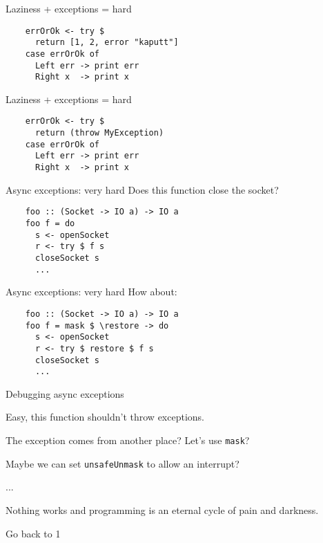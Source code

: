 \documentclass[20pt]{beamer}
\begin{document}
\begin{frame}[fragile]{Laziness + exceptions = hard}
    \begin{lstlisting}
    errOrOk <- try $
      return [1, 2, error "kaputt"]
    case errOrOk of
      Left err -> print err
      Right x  -> print x
    \end{lstlisting}
\end{frame}

\begin{frame}[fragile]{Laziness + exceptions = hard}
    \begin{lstlisting}
    errOrOk <- try $
      return (throw MyException)
    case errOrOk of
      Left err -> print err
      Right x  -> print x
    \end{lstlisting}
\end{frame}

\begin{frame}[fragile]{Async exceptions: very hard}
    Does this function close the socket?
    \begin{lstlisting}
    foo :: (Socket -> IO a) -> IO a
    foo f = do
      s <- openSocket
      r <- try $ f s
      closeSocket s
      ...
    \end{lstlisting}
\end{frame}

\begin{frame}[fragile]{Async exceptions: very hard}
    How about:
    \begin{lstlisting}
    foo :: (Socket -> IO a) -> IO a
    foo f = mask $ \restore -> do
      s <- openSocket
      r <- try $ restore $ f s
      closeSocket s
      ...
    \end{lstlisting}
\end{frame}

\begin{frame}{Debugging async exceptions}
    \begin{enumerate}
    \normalsize{\item Easy, this function shouldn't throw exceptions.}
    \small{\item The exception comes from another place? Let's use
        \texttt{mask}?}
    \footnotesize{\item Maybe we can set \texttt{unsafeUnmask} to allow an
        interrupt?}
    \footnotesize{\item ...}
    \tiny{\item Nothing works and programming is an eternal cycle of pain and
        darkness.}
    \tiny{\item Go back to 1}
    \end{enumerate}
\end{frame}
\end{document}
